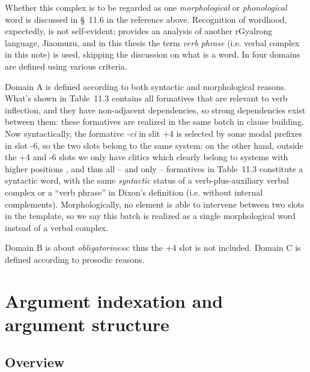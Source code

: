 \documentclass[a4paper, oneside, 12pt]{report}
\newcommand*{\citesec}[1]{\S~{#1}}
\newcommand*{\citetable}[1]{Table~{#1}}
\newcommand*{\term}[1]{\emph{#1}}
\newcommand{\form}[1]{\emph{#1}}
\begin{document}
Whether this complex is to be regarded as one \emph{morphological} or \emph{phonological} word 
is discussed in \citesec{11.6}
in the reference above.
Recognition of wordhood, expectedly, is not self-evident;
\citet{prins2011web} provides an analysis of another rGyalrong language, Jiaomuzu, 
and in this thesis the term \term{verb phrase} 
(i.e. verbal complex in this note) is used,
skipping the discussion on what is a word.
In \citet[\citetable{11.3}]{jacques2021grammar}
four domains are defined using various criteria.

Domain A is defined according to both syntactic and morphological reasons.
What's shown in 
\citetable{11.3} contains all formatives that are relevant to verb inflection,
and they have non-adjacent dependencies,
so strong dependencies exist between them:
these formatives are realized in the same batch 
in clause building.
Now syntactically, the formative \form{-ci} in slit +4 
is selected by some modal prefixes in slot -6,
so the two slots belong to the same system;
on the other hand, outside the +4 and -6 slots 
we only have clitics which clearly belong to systems with higher positions
\citep[\citesec{11.6.2}]{jacques2021grammar},
and thus all -- and only -- formatives in \citetable{11.3}
constitute a syntactic word,
with the same \emph{syntactic} status of a verb-plus-auxiliary verbal complex or a
``verb phrase'' in Dixon's definition (i.e. without internal complements). 
Morphologically, no element is able to intervene 
between two slots in the template, 
so we say this batch is realized as a single morphological word 
instead of a verbal complex.

Domain B is about \emph{obligatoriness}:
thus the +4 slot is not included.
Domain C is defined according to prosodic reasons.

\chapter{Argument indexation and argument structure}

\section{Overview}
\end{document}
